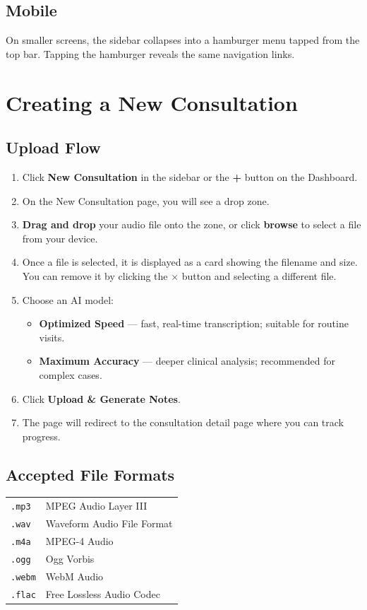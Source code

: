 \documentclass[12pt,a4paper]{article}
\begin{document}
\subsection{Mobile}
On smaller screens, the sidebar collapses into a hamburger menu
tapped from the top bar. Tapping the hamburger reveals the same navigation links.

\section{Creating a New Consultation}

\subsection{Upload Flow}
\begin{enumerate}
	\item Click \textbf{New Consultation} in the sidebar or the \textbf{+} button on the Dashboard.
	\item On the New Consultation page, you will see a drop zone.
	\item \textbf{Drag and drop} your audio file onto the zone, or click \textbf{browse} to select a file from your device.
	\item Once a file is selected, it is displayed as a card showing the filename and size. You can remove it by clicking the $\times$ button and selecting a different file.
	\item Choose an AI model:
	      \begin{itemize}
		      \item \textbf{Optimized Speed} — fast, real-time transcription; suitable for routine visits.
		      \item \textbf{Maximum Accuracy} — deeper clinical analysis; recommended for complex cases.
	      \end{itemize}
	\item Click \textbf{Upload \& Generate Notes}.
	\item The page will redirect to the consultation detail page where you can track progress.
\end{enumerate}

\subsection{Accepted File Formats}
\begin{tabular}{ll}
	\texttt{.mp3}  & MPEG Audio Layer III       \\
	\texttt{.wav}  & Waveform Audio File Format \\
	\texttt{.m4a}  & MPEG-4 Audio               \\
	\texttt{.ogg}  & Ogg Vorbis                 \\
	\texttt{.webm} & WebM Audio                 \\
	\texttt{.flac} & Free Lossless Audio Codec  \\
\end{tabular}
\end{document}
